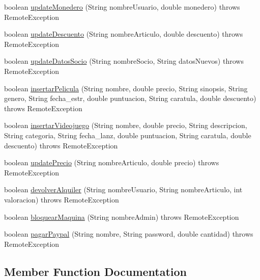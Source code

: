 \begin{DoxyCompactItemize}
\item 
boolean \mbox{\hyperlink{interfacees_1_1deusto_1_1server_1_1remote_1_1_i_server_aaba707260bfdd38c477bea520a440119}{update\+Monedero}} (String nombre\+Usuario, double monedero)  throws Remote\+Exception
\item 
boolean \mbox{\hyperlink{interfacees_1_1deusto_1_1server_1_1remote_1_1_i_server_ae6b1019df65fbd61a4f35981b883116f}{update\+Descuento}} (String nombre\+Articulo, double descuento)  throws Remote\+Exception
\item 
boolean \mbox{\hyperlink{interfacees_1_1deusto_1_1server_1_1remote_1_1_i_server_a585b4e8eb577808d6b7f0b47d0f7b724}{update\+Datos\+Socio}} (String nombre\+Socio, String datos\+Nuevos)  throws Remote\+Exception
\item 
boolean \mbox{\hyperlink{interfacees_1_1deusto_1_1server_1_1remote_1_1_i_server_aef2c6618c8d38cbd221c290875f37e69}{insertar\+Pelicula}} (String nombre, double precio, String sinopsis, String genero, String fecha\+\_\+estr, double puntuacion, String caratula, double descuento)  throws Remote\+Exception
\item 
boolean \mbox{\hyperlink{interfacees_1_1deusto_1_1server_1_1remote_1_1_i_server_a41c5cae2283787ff002699c2ff1d5877}{insertar\+Videojuego}} (String nombre, double precio, String descripcion, String categoria, String fecha\+\_\+lanz, double puntuacion, String caratula, double descuento)  throws Remote\+Exception
\item 
boolean \mbox{\hyperlink{interfacees_1_1deusto_1_1server_1_1remote_1_1_i_server_a1debc07cec3cad9a483dee4dfa79af72}{update\+Precio}} (String nombre\+Articulo, double precio)  throws Remote\+Exception
\item 
boolean \mbox{\hyperlink{interfacees_1_1deusto_1_1server_1_1remote_1_1_i_server_a145e3b64f34bedd019267417d8efcc64}{devolver\+Alquiler}} (String nombre\+Usuario, String nombre\+Articulo, int valoracion)  throws Remote\+Exception
\item 
boolean \mbox{\hyperlink{interfacees_1_1deusto_1_1server_1_1remote_1_1_i_server_adaf581e514d28fa130d44aceaf2fcc07}{bloquear\+Maquina}} (String nombre\+Admin)  throws Remote\+Exception
\item 
boolean \mbox{\hyperlink{interfacees_1_1deusto_1_1server_1_1remote_1_1_i_server_ae5fa0451aba57506212a5bd3674c060a}{pagar\+Paypal}} (String nombre, String password, double cantidad)  throws Remote\+Exception
\end{DoxyCompactItemize}


\subsection{Member Function Documentation}
\mbox{\label{interfacees_1_1deusto_1_1server_1_1remote_1_1_i_server_adaf581e514d28fa130d44aceaf2fcc07}} 
